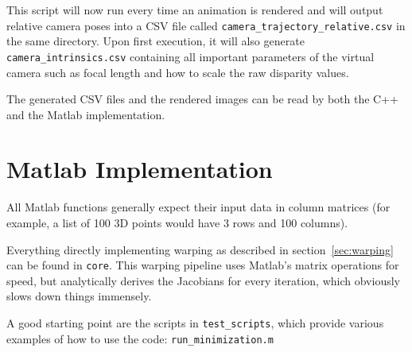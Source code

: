 This script will now run every time an animation is rendered and will output
relative camera poses into a CSV file called
\texttt{camera\_trajectory\_relative.csv} in the same directory. Upon first
execution, it will also generate \texttt{camera\_intrinsics.csv} containing all
important parameters of the virtual camera such as focal length and how to
scale the raw disparity values.

The generated CSV files and the rendered images can be read by both the C++ and
the Matlab implementation.


\section{Matlab Implementation}

All Matlab functions generally expect their input data in column matrices (for
example, a list of 100 3D points would have 3 rows and 100 columns).

Everything directly implementing warping as described in
section~\ref{sec:warping} can be found in \texttt{core}. This warping pipeline
uses Matlab's matrix operations for speed, but analytically derives the
Jacobians for every iteration, which obviously slows down things immensely.

A good starting point are the scripts in \texttt{test\_scripts}, which provide
various examples of how to use the code: \texttt{run\_minimization.m}
